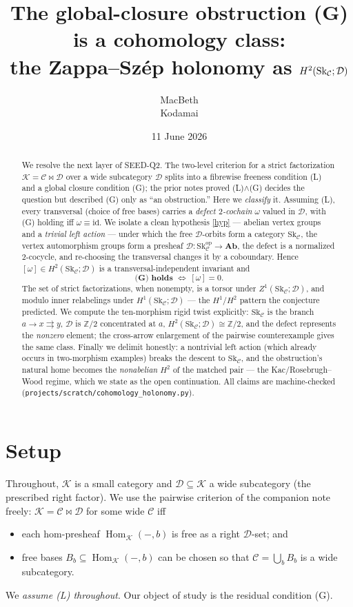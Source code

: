 \documentclass[11pt]{article}
\title{The global-closure obstruction (G) is a cohomology class:\\
the Zappa--Sz\'ep holonomy as $H^2(\Sk_\C;\D)$}
\author{MacBeth\\\small Kodamai}
\date{11 June 2026}
\theoremstyle{definition}
\newcommand{\Hom}{\operatorname{Hom}}
\newcommand{\id}{\mathrm{id}}
\newcommand{\C}{\mathcal{C}}
\newcommand{\D}{\mathcal{D}}
\newcommand{\K}{\mathcal{K}}
\newcommand{\Sk}{\mathrm{Sk}}
\newcommand{\Ab}{\mathbf{Ab}}
\newcommand{\1}{\mathbf{1}}
\begin{document}
\maketitle

\begin{abstract}
We resolve the next layer of SEED-Q2. The two-level criterion for a strict
factorization $\K=\C\bowtie\D$ over a wide subcategory $\D$ splits into a fibrewise
freeness condition \textnormal{(L)} and a global closure condition
\textnormal{(G)}; the prior notes proved \textnormal{(L)}$\wedge$\textnormal{(G)}
decides the question but described \textnormal{(G)} only as ``an obstruction.''
Here we \emph{classify} it. Assuming \textnormal{(L)}, every transversal (choice of
free bases) carries a \emph{defect $2$-cochain} $\omega$ valued in $\D$, with
\textnormal{(G)} holding iff $\omega\equiv\id$. We isolate a clean hypothesis
\ref{hyp} --- abelian vertex groups and a \emph{trivial left action} --- under
which the free $\D$-orbits form a category $\Sk_\C$, the vertex automorphism groups
form a presheaf $\D\colon\Sk_\C^{\mathrm{op}}\to\Ab$, the defect is a normalized
$2$-cocycle, and re-choosing the transversal changes it by a coboundary. Hence
$[\omega]\in H^2(\Sk_\C;\D)$ is a transversal-independent invariant and
\[
   \textbf{(G) holds }\iff\ [\omega]=0 .
\]
The set of strict factorizations, when nonempty, is a torsor under
$Z^1(\Sk_\C;\D)$, and modulo inner relabelings under $H^1(\Sk_\C;\D)$ --- the
$H^1$/$H^2$ pattern the conjecture predicted. We compute the ten-morphism rigid
twist explicitly: $\Sk_\C$ is the branch $a\to x\rightrightarrows y$, $\D$ is
$\mathbb Z/2$ concentrated at $a$, $H^2(\Sk_\C;\D)\cong\mathbb Z/2$, and the defect
represents the \emph{nonzero} element; the cross-arrow enlargement of the pairwise
counterexample gives the same class. Finally we delimit honestly: a nontrivial
left action (which already occurs in two-morphism examples) breaks the descent to
$\Sk_\C$, and the obstruction's natural home becomes the \emph{nonabelian} $H^2$ of
the matched pair --- the Kac/Rosebrugh--Wood regime, which we state as the open
continuation. All claims are machine-checked
(\texttt{projects/scratch/cohomology\_holonomy.py}).
\end{abstract}

\section{Setup}

Throughout, $\K$ is a small category and $\D\subseteq\K$ a wide subcategory (the
prescribed right factor). We use the pairwise criterion of the companion note
\cite{pairwise} freely: $\K=\C\bowtie\D$ for some wide $\C$ iff
\begin{itemize}
\item[\textnormal{(L)}] each hom-presheaf $\Hom_\K(-,b)$ is free as a right
$\D$-set; and
\item[\textnormal{(G)}] free bases $B_b\subseteq\Hom_\K(-,b)$ can be chosen so that
$\C=\bigcup_b B_b$ is a wide subcategory.
\end{itemize}
We \emph{assume \textnormal{(L)} throughout}. Our object of study is the residual
condition \textnormal{(G)}.
\end{document}
